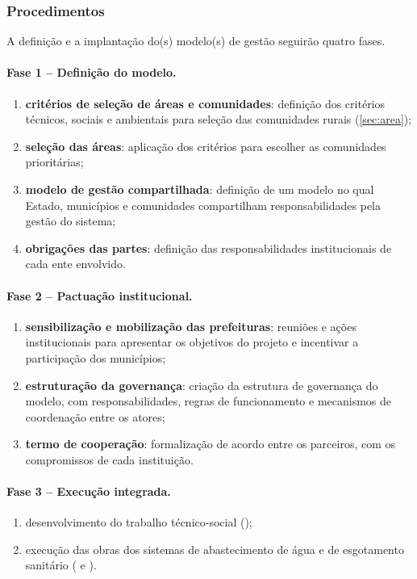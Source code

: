 \subsubsection{Procedimentos}

A definição e a implantação do(s) modelo(s) de gestão seguirão quatro fases.

\paragraph{Fase 1 -- Definição do modelo.}
\begin{enumerate}[label=\alph*)]
  \item \textbf{critérios de seleção de áreas e comunidades}: definição dos
        critérios técnicos, sociais e ambientais para seleção das comunidades
        rurais (\autoref{sec:area});
  \item \textbf{seleção das áreas}: aplicação dos critérios para escolher as
        comunidades prioritárias;
  \item \textbf{modelo de gestão compartilhada}: definição de um modelo no
        qual Estado, municípios e comunidades compartilham responsabilidades
        pela gestão do sistema;
  \item \textbf{obrigações das partes}: definição das responsabilidades
        institucionais de cada ente envolvido.
\end{enumerate}

\paragraph{Fase 2 -- Pactuação institucional.}
\begin{enumerate}[label=\alph*), resume]
  \item \textbf{sensibilização e mobilização das prefeituras}: reuniões e
        ações institucionais para apresentar os objetivos do projeto e
        incentivar a participação dos municípios;
  \item \textbf{estruturação da governança}: criação da estrutura de
        governança do modelo, com responsabilidades, regras de funcionamento
        e mecanismos de coordenação entre os atores;
  \item \textbf{termo de cooperação}: formalização de acordo entre os
        parceiros, com os compromissos de cada instituição.
\end{enumerate}

\paragraph{Fase 3 -- Execução integrada.}
\begin{enumerate}[label=\alph*), resume]
  \item desenvolvimento do trabalho técnico-social ();
  \item execução das obras dos sistemas de abastecimento de água e de
        esgotamento sanitário ( e ).
\end{enumerate}

